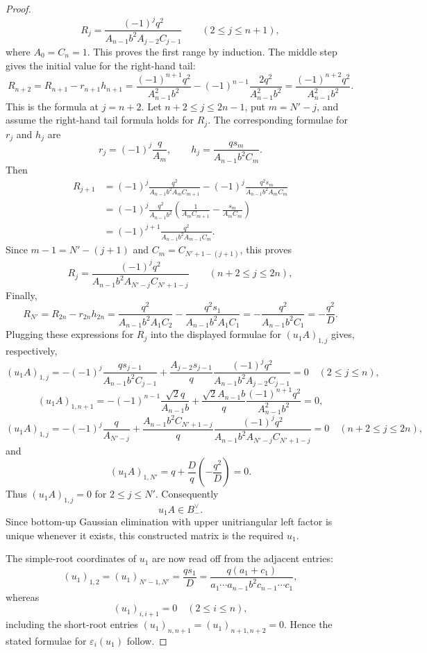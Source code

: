 \begin{proof}
\[
R_j
=
\frac{(-1)^jq^2}{A_{n-1}b^2A_{j-2}C_{j-1}}
\qquad(2\le j\le n+1),
\]
where \(A_0=C_n=1\). This proves the first range by induction. The middle step gives the initial value for the right-hand tail:
\[
R_{n+2}
=
R_{n+1}-r_{n+1}h_{n+1}
=
\frac{(-1)^{n+1}q^2}{A_{n-1}^2b^2}
-
(-1)^{n-1}\frac{2q^2}{A_{n-1}^2b^2}
=
\frac{(-1)^{n+2}q^2}{A_{n-1}^2b^2}.
\]
This is the formula at \(j=n+2\). Let \(n+2\le j\le 2n-1\), put \(m=N'-j\), and assume the right-hand tail formula holds for \(R_j\). The corresponding formulae for \(r_j\) and \(h_j\) are
\[
r_j=(-1)^j\frac{q}{A_m},
\qquad
h_j=\frac{q s_m}{A_{n-1}b^2C_m}.
\]
Then
\[
\begin{aligned}
R_{j+1}
&=
(-1)^j
\frac{q^2}{A_{n-1}b^2A_mC_{m+1}}
-
(-1)^j
\frac{q^2s_m}{A_{n-1}b^2A_mC_m}\\
&=
(-1)^j\frac{q^2}{A_{n-1}b^2}
\left(
\frac{1}{A_mC_{m+1}}
-
\frac{s_m}{A_mC_m}
\right)\\
&=
(-1)^{j+1}
\frac{q^2}{A_{n-1}b^2A_{m-1}C_m}.
\end{aligned}
\]
Since \(m-1=N'-(j+1)\) and \(C_m=C_{N'+1-(j+1)}\), this proves
\[
R_j
=
\frac{(-1)^jq^2}{A_{n-1}b^2A_{N'-j}C_{N'+1-j}}
\qquad(n+2\le j\le 2n),
\]
Finally,
\[
R_{N'}
=R_{2n}-r_{2n}h_{2n}
=
\frac{q^2}{A_{n-1}b^2A_1C_2}
-
\frac{q^2s_1}{A_{n-1}b^2A_1C_1}
=-\frac{q^2}{A_{n-1}b^2C_1}
=-\frac{q^2}{D}.
\]
Plugging these expressions for \(R_j\) into the displayed formulae for \((u_1A)_{1,j}\) gives, respectively,
\[
(u_1A)_{1,j}
=
-(-1)^j\frac{q s_{j-1}}{A_{n-1}b^2C_{j-1}}
+
\frac{A_{j-2}s_{j-1}}{q}
\frac{(-1)^jq^2}{A_{n-1}b^2A_{j-2}C_{j-1}}
=0
\quad(2\le j\le n),
\]
\[
(u_1A)_{1,n+1}
=
-(-1)^{n-1}\frac{\sqrt2q}{A_{n-1}b}
+
\frac{\sqrt2A_{n-1}b}{q}
\frac{(-1)^{n+1}q^2}{A_{n-1}^2b^2}
=0,
\]
\[
(u_1A)_{1,j}
=
-(-1)^j\frac{q}{A_{N'-j}}
+
\frac{A_{n-1}b^2C_{N'+1-j}}{q}
\frac{(-1)^jq^2}{A_{n-1}b^2A_{N'-j}C_{N'+1-j}}
=0
\quad(n+2\le j\le 2n),
\]
and
\[
(u_1A)_{1,N'}=q+\frac{D}{q}\left(-\frac{q^2}{D}\right)=0.
\]
Thus \((u_1A)_{1,j}=0\) for \(2\le j\le N'\). Consequently
\[
u_1A\in B_-^\vee.
\]
Since bottom-up Gaussian elimination with upper unitriangular left factor is unique whenever it exists, this constructed matrix is the required \(u_1\).

The simple-root coordinates of \(u_1\) are now read off from the adjacent entries:
\[
(u_1)_{1,2}=(u_1)_{N'-1,N'}=\frac{q s_1}{D}
=
\frac{q(a_1+c_1)}{a_1\cdots a_{n-1}b^2c_{n-1}\cdots c_1},
\]
whereas
\[
(u_1)_{i,i+1}=0\quad(2\le i\le n),
\]
including the short-root entries \((u_1)_{n,n+1}=(u_1)_{n+1,n+2}=0\). Hence the stated formulae for \(\varepsilon_i(u_1)\) follow.
\end{proof}

